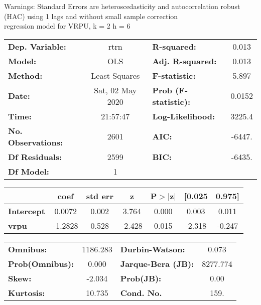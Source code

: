 Warnings: \newline
 [1] Standard Errors are heteroscedasticity and autocorrelation robust (HAC) using 1 lags and without small sample correction\\ 

regression model for VRPU, k = 2 h = 6\begin{center}
\begin{tabular}{lclc}
\toprule
\textbf{Dep. Variable:}    &       rtrn       & \textbf{  R-squared:         } &     0.013   \\
\textbf{Model:}            &       OLS        & \textbf{  Adj. R-squared:    } &     0.013   \\
\textbf{Method:}           &  Least Squares   & \textbf{  F-statistic:       } &     5.897   \\
\textbf{Date:}             & Sat, 02 May 2020 & \textbf{  Prob (F-statistic):} &   0.0152    \\
\textbf{Time:}             &     21:57:47     & \textbf{  Log-Likelihood:    } &    3225.4   \\
\textbf{No. Observations:} &        2601      & \textbf{  AIC:               } &    -6447.   \\
\textbf{Df Residuals:}     &        2599      & \textbf{  BIC:               } &    -6435.   \\
\textbf{Df Model:}         &           1      & \textbf{                     } &             \\
\bottomrule
\end{tabular}
\begin{tabular}{lcccccc}
                   & \textbf{coef} & \textbf{std err} & \textbf{z} & \textbf{P$> |$z$|$} & \textbf{[0.025} & \textbf{0.975]}  \\
\midrule
\textbf{Intercept} &       0.0072  &        0.002     &     3.764  &         0.000        &        0.003    &        0.011     \\
\textbf{vrpu}      &      -1.2828  &        0.528     &    -2.428  &         0.015        &       -2.318    &       -0.247     \\
\bottomrule
\end{tabular}
\begin{tabular}{lclc}
\textbf{Omnibus:}       & 1186.283 & \textbf{  Durbin-Watson:     } &    0.073  \\
\textbf{Prob(Omnibus):} &   0.000  & \textbf{  Jarque-Bera (JB):  } & 8277.774  \\
\textbf{Skew:}          &  -2.034  & \textbf{  Prob(JB):          } &     0.00  \\
\textbf{Kurtosis:}      &  10.735  & \textbf{  Cond. No.          } &     159.  \\
\bottomrule
\end{tabular}
\end{center}


